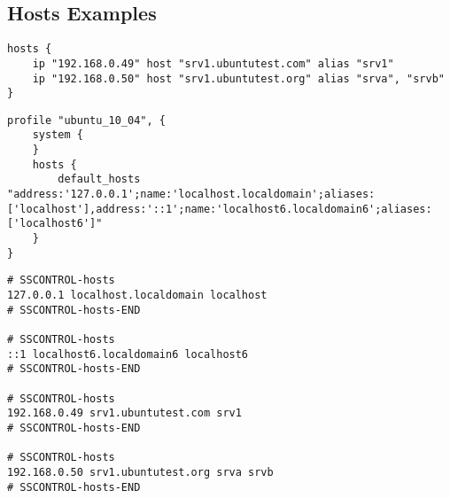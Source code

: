 \subsection{Hosts Examples}

\begin{lstlisting}[style=Sscontrol,
label={lst:hosts_example_script},
title={Adds IP addresses and the host name.}]
hosts {
    ip "192.168.0.49" host "srv1.ubuntutest.com" alias "srv1"
    ip "192.168.0.50" host "srv1.ubuntutest.org" alias "srva", "srvb"
}
\end{lstlisting}

\begin{lstlisting}[style=Sscontrol,
label={lst:hosts_ubuntu_profile},
title={Sets default list of hosts.}]
profile "ubuntu_10_04", {
    system {
    }
    hosts {
        default_hosts "address:'127.0.0.1';name:'localhost.localdomain';aliases:['localhost'],address:'::1';name:'localhost6.localdomain6';aliases:['localhost6']"
    }
}
\end{lstlisting}

\begin{lstlisting}[style=rcfile_nonumbers,
label={lst:hosts_example},
title={Example hosts configuration file.}]
# SSCONTROL-hosts
127.0.0.1 localhost.localdomain localhost
# SSCONTROL-hosts-END

# SSCONTROL-hosts
::1 localhost6.localdomain6 localhost6
# SSCONTROL-hosts-END

# SSCONTROL-hosts
192.168.0.49 srv1.ubuntutest.com srv1
# SSCONTROL-hosts-END

# SSCONTROL-hosts
192.168.0.50 srv1.ubuntutest.org srva srvb
# SSCONTROL-hosts-END
\end{lstlisting}

